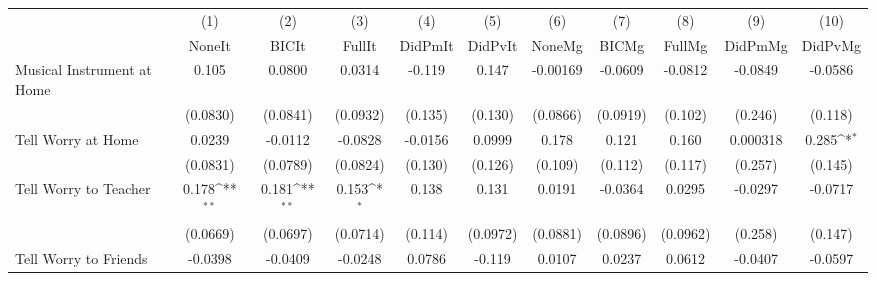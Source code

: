 {
\def\sym#1{\ifmmode^{#1}\else\(^{#1}\)\fi}
\begin{tabular}{l*{10}{c}}
\toprule
            &\multicolumn{1}{c}{(1)}&\multicolumn{1}{c}{(2)}&\multicolumn{1}{c}{(3)}&\multicolumn{1}{c}{(4)}&\multicolumn{1}{c}{(5)}&\multicolumn{1}{c}{(6)}&\multicolumn{1}{c}{(7)}&\multicolumn{1}{c}{(8)}&\multicolumn{1}{c}{(9)}&\multicolumn{1}{c}{(10)}\\
            &\multicolumn{1}{c}{NoneIt}&\multicolumn{1}{c}{BICIt}&\multicolumn{1}{c}{FullIt}&\multicolumn{1}{c}{DidPmIt}&\multicolumn{1}{c}{DidPvIt}&\multicolumn{1}{c}{NoneMg}&\multicolumn{1}{c}{BICMg}&\multicolumn{1}{c}{FullMg}&\multicolumn{1}{c}{DidPmMg}&\multicolumn{1}{c}{DidPvMg}\\
\midrule
Musical Instrument at Home&       0.105         &      0.0800         &      0.0314         &      -0.119         &       0.147         &    -0.00169         &     -0.0609         &     -0.0812         &     -0.0849         &     -0.0586         \\
            &    (0.0830)         &    (0.0841)         &    (0.0932)         &     (0.135)         &     (0.130)         &    (0.0866)         &    (0.0919)         &     (0.102)         &     (0.246)         &     (0.118)         \\
\addlinespace
Tell Worry at Home&      0.0239         &     -0.0112         &     -0.0828         &     -0.0156         &      0.0999         &       0.178         &       0.121         &       0.160         &    0.000318         &       0.285\sym{*}  \\
            &    (0.0831)         &    (0.0789)         &    (0.0824)         &     (0.130)         &     (0.126)         &     (0.109)         &     (0.112)         &     (0.117)         &     (0.257)         &     (0.145)         \\
\addlinespace
Tell Worry to Teacher&       0.178\sym{**} &       0.181\sym{**} &       0.153\sym{*}  &       0.138         &       0.131         &      0.0191         &     -0.0364         &      0.0295         &     -0.0297         &     -0.0717         \\
            &    (0.0669)         &    (0.0697)         &    (0.0714)         &     (0.114)         &    (0.0972)         &    (0.0881)         &    (0.0896)         &    (0.0962)         &     (0.258)         &     (0.147)         \\
\addlinespace
Tell Worry to Friends&     -0.0398         &     -0.0409         &     -0.0248         &      0.0786         &      -0.119         &      0.0107         &      0.0237         &      0.0612         &     -0.0407         &     -0.0597         \\

\end{tabular}}

